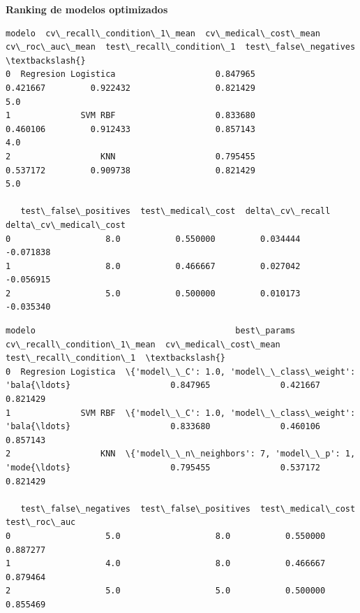 \documentclass[11pt]{article}
\begin{document}
    
    \textbf{Ranking de modelos optimizados}

    
    
    \begin{Verbatim}[commandchars=\\\{\}]
                modelo  cv\_recall\_condition\_1\_mean  cv\_medical\_cost\_mean  cv\_roc\_auc\_mean  test\_recall\_condition\_1  test\_false\_negatives  \textbackslash{}
0  Regresion Logistica                    0.847965              0.421667         0.922432                 0.821429                   5.0   
1              SVM RBF                    0.833680              0.460106         0.912433                 0.857143                   4.0   
2                  KNN                    0.795455              0.537172         0.909738                 0.821429                   5.0   

   test\_false\_positives  test\_medical\_cost  delta\_cv\_recall  delta\_cv\_medical\_cost  
0                   8.0           0.550000         0.034444              -0.071838  
1                   8.0           0.466667         0.027042              -0.056915  
2                   5.0           0.500000         0.010173              -0.035340  
    \end{Verbatim}

    
    
    \begin{Verbatim}[commandchars=\\\{\}]
                modelo                                        best\_params  cv\_recall\_condition\_1\_mean  cv\_medical\_cost\_mean  test\_recall\_condition\_1  \textbackslash{}
0  Regresion Logistica  \{'model\_\_C': 1.0, 'model\_\_class\_weight': 'bala{\ldots}                    0.847965              0.421667                 0.821429   
1              SVM RBF  \{'model\_\_C': 1.0, 'model\_\_class\_weight': 'bala{\ldots}                    0.833680              0.460106                 0.857143   
2                  KNN  \{'model\_\_n\_neighbors': 7, 'model\_\_p': 1, 'mode{\ldots}                    0.795455              0.537172                 0.821429   

   test\_false\_negatives  test\_false\_positives  test\_medical\_cost  test\_roc\_auc  
0                   5.0                   8.0           0.550000      0.887277  
1                   4.0                   8.0           0.466667      0.879464  
2                   5.0                   5.0           0.500000      0.855469  
    \end{Verbatim}
\end{document}
